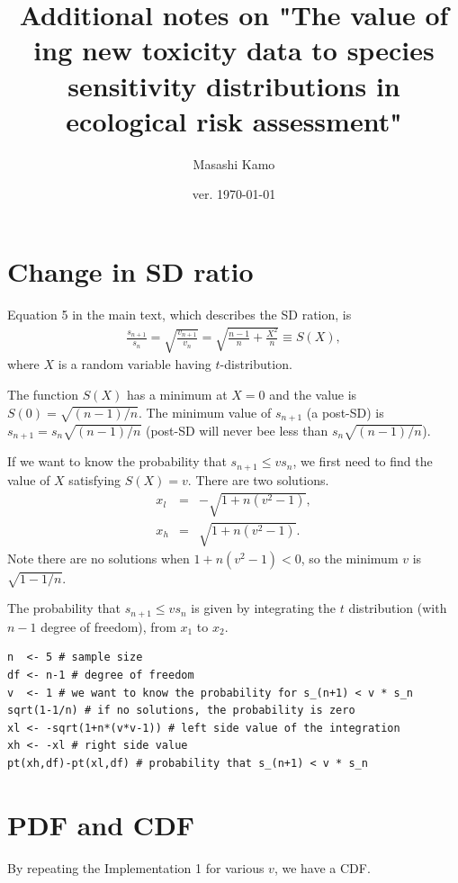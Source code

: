 \documentclass[10pt]{article}
\title{Additional notes on "The value of 	ing new toxicity data to species sensitivity distributions in ecological risk assessment"}
\author{Masashi Kamo}
\date{ver. \today}
\begin{document}
\maketitle



\section{Change in SD ratio}
Equation 5 in the main text, which describes the SD ration, is
\begin{eqnarray}
\nonumber
\frac{s_{n+1}}{s_n} = \sqrt{\frac{v_{n+1}}{v_n}} = \sqrt{\frac{n-1}{n}+\frac{X^2}{n}} \equiv S(X),
\end{eqnarray}
where $X$ is a random variable having $t$-distribution. 

The function $S(X)$ has a minimum at $X=0$ and the value is $S(0) = \sqrt{(n-1)/n}$. The minimum value of $s_{n+1}$ (a post-SD) is $s_{n+1} = s_n \sqrt{(n-1)/n}$ (post-SD will never bee less than $s_n \sqrt{(n-1)/n}$).

If we want to know the probability that $s_{n+1} \le v s_n$, we first need to find the value of $X$ satisfying $S(X) = v$. There are two solutions.
\begin{eqnarray}
\nonumber
x_l &=& -\sqrt{1+ n(v^2-1)}, \\
\nonumber
x_h &=& \sqrt{1+ n(v^2-1)}.
\end{eqnarray}
Note there are no solutions when $1+ n(v^2-1)<0$, so the minimum $v$ is $\sqrt{1-1/n}$.

The probability that $s_{n+1} \le v s_n$ is given by integrating the $t$ distribution (with $n-1$ degree of freedom), from $x_1$ to $x_2$. 

\begin{lstlisting}[caption=Probability that $s_{n+1} < s_n$, label=probFinder]
n  <- 5 # sample size
df <- n-1 # degree of freedom
v  <- 1 # we want to know the probability for s_(n+1) < v * s_n 
sqrt(1-1/n) # if no solutions, the probability is zero
xl <- -sqrt(1+n*(v*v-1)) # left side value of the integration
xh <- -xl # right side value
pt(xh,df)-pt(xl,df) # probability that s_(n+1) < v * s_n 
\end{lstlisting}

\section{PDF and CDF}
By repeating the Implementation 1 for various $v$, we have a CDF. 
\end{document}
